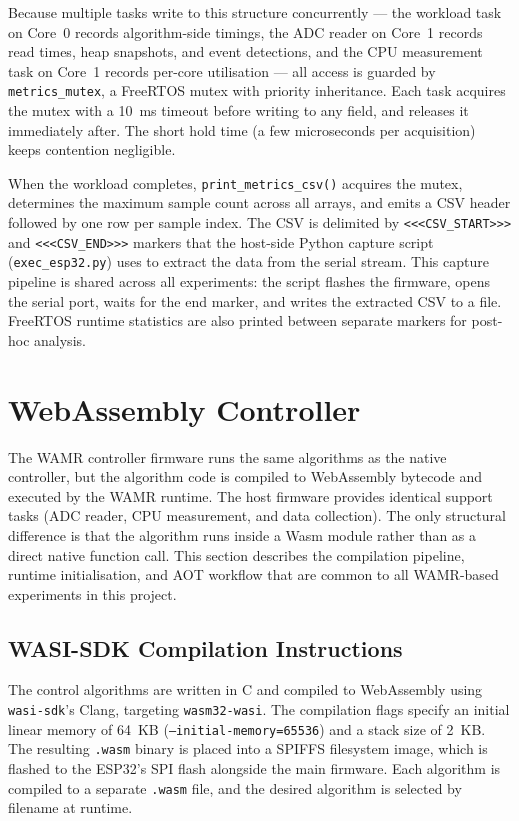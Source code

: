 \documentclass[12pt, a4paper]{report}
\begin{document}
Because multiple tasks write to this structure concurrently --- the workload task on Core~0 records algorithm-side timings, the ADC reader on Core~1 records read times, heap snapshots, and event detections, and the CPU measurement task on Core~1 records per-core utilisation --- all access is guarded by \texttt{metrics\_mutex}, a FreeRTOS mutex with priority inheritance. Each task acquires the mutex with a 10~ms timeout before writing to any field, and releases it immediately after. The short hold time (a few microseconds per acquisition) keeps contention negligible.

When the workload completes, \texttt{print\_metrics\_csv()} acquires the mutex, determines the maximum sample count across all arrays, and emits a CSV header followed by one row per sample index. The CSV is delimited by \texttt{<<<CSV\_START>>>} and \texttt{<<<CSV\_END>>>} markers that the host-side Python capture script (\texttt{exec\_esp32.py}) uses to extract the data from the serial stream. This capture pipeline is shared across all experiments: the script flashes the firmware, opens the serial port, waits for the end marker, and writes the extracted CSV to a file. FreeRTOS runtime statistics are also printed between separate markers for post-hoc analysis.


\section{WebAssembly Controller}
\label{sec:wamr-controller}

The WAMR controller firmware runs the same algorithms as the native controller, but the algorithm code is compiled to WebAssembly bytecode and executed by the WAMR runtime. The host firmware provides identical support tasks (ADC reader, CPU measurement, and data collection). The only structural difference is that the algorithm runs inside a Wasm module rather than as a direct native function call. This section describes the compilation pipeline, runtime initialisation, and AOT workflow that are common to all WAMR-based experiments in this project.

\subsection{WASI-SDK Compilation Instructions}
\label{subsec:wasm-pipeline}

The control algorithms are written in C and compiled to WebAssembly using \texttt{wasi-sdk}'s Clang, targeting \texttt{wasm32-wasi}. The compilation flags specify an initial linear memory of 64~KB (\texttt{--initial-memory=65536}) and a stack size of 2~KB. The resulting \texttt{.wasm} binary is placed into a SPIFFS filesystem image, which is flashed to the ESP32's SPI flash alongside the main firmware. Each algorithm is compiled to a separate \texttt{.wasm} file, and the desired algorithm is selected by filename at runtime.
\end{document}
